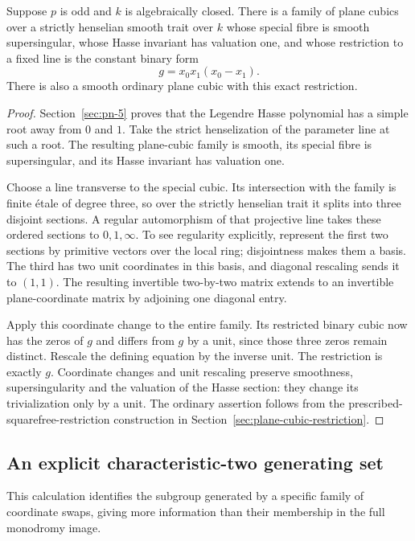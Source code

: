 \begin{lemma}\label{lem:elliptic-constant-section}
Suppose $p$ is odd and $k$ is algebraically closed. There is a family of plane cubics over a strictly henselian smooth trait over $k$ whose special fibre is smooth supersingular, whose Hasse invariant has valuation one, and whose restriction to a fixed line is the constant binary form
\[
g=x_0x_1(x_0-x_1).
\]
There is also a smooth ordinary plane cubic with this exact restriction.
\end{lemma}
\begin{proof}
Section~\ref{sec:pn-5} proves that the Legendre Hasse polynomial has a simple root away from $0$ and $1$. Take the strict henselization of the parameter line at such a root. The resulting plane-cubic family is smooth, its special fibre is supersingular, and its Hasse invariant has valuation one.

Choose a line transverse to the special cubic. Its intersection with the family is finite \textup{\'etale} of degree three, so over the strictly henselian trait it splits into three disjoint sections. A regular automorphism of that projective line takes these ordered sections to $0,1,\infty$. To see regularity explicitly, represent the first two sections by primitive vectors over the local ring; disjointness makes them a basis. The third has two unit coordinates in this basis, and diagonal rescaling sends it to $(1,1)$. The resulting invertible two-by-two matrix extends to an invertible plane-coordinate matrix by adjoining one diagonal entry.

Apply this coordinate change to the entire family. Its restricted binary cubic now has the zeros of $g$ and differs from $g$ by a unit, since those three zeros remain distinct. Rescale the defining equation by the inverse unit. The restriction is exactly $g$. Coordinate changes and unit rescaling preserve smoothness, supersingularity and the valuation of the Hasse section: they change its trivialization only by a unit. The ordinary assertion follows from the prescribed-squarefree-restriction construction in Section~\ref{sec:plane-cubic-restriction}.
\end{proof}

\subsection{An explicit characteristic-two generating set}\label{app:coordinate-generators}
This calculation identifies the subgroup generated by a specific family of coordinate swaps, giving more information than their membership in the full monodromy image.

